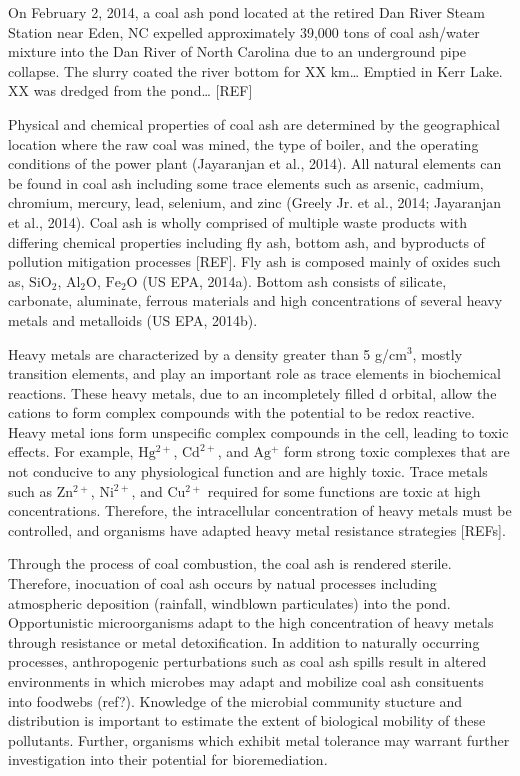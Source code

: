 \documentclass[ms]{uncgdissertationexp}
\theoremstyle{plain}
\theoremstyle{definition}
\theoremstyle{remark}
\begin{document}
  On February 2, 2014, a coal ash pond located at the retired Dan River
  Steam Station near Eden, NC expelled approximately 39,000 tons of coal
  ash/water mixture into the Dan River of North Carolina due to an
  underground pipe collapse. The slurry coated the river bottom for XX
  km\ldots{} Emptied in Kerr Lake. XX was dredged from the pond\ldots{}
  {[}REF{]}
  
  Physical and chemical properties of coal ash are determined by the
  geographical location where the raw coal was mined, the type of boiler,
  and the operating conditions of the power plant (Jayaranjan et al.,
  2014). All natural elements can be found in coal ash including some
  trace elements such as arsenic, cadmium, chromium, mercury, lead,
  selenium, and zinc (Greely Jr. et al., 2014; Jayaranjan et al., 2014).
  Coal ash is wholly comprised of multiple waste products with differing
  chemical properties including fly ash, bottom ash, and byproducts of
  pollution mitigation processes {[}REF{]}. Fly ash is composed mainly of
  oxides such as, \(\mathrm{SiO_2}\), \(\mathrm{Al_2O}\),
  \(\mathrm{Fe_2O}\) (US EPA, 2014a). Bottom ash consists of silicate,
  carbonate, aluminate, ferrous materials and high concentrations of
  several heavy metals and metalloids (US EPA, 2014b).
  
  Heavy metals are characterized by a density greater than 5
  g/\(\mathrm{cm^3}\), mostly transition elements, and play an important
  role as trace elements in biochemical reactions. These heavy metals, due
  to an incompletely filled d orbital, allow the cations to form complex
  compounds with the potential to be redox reactive. Heavy metal ions form
  unspecific complex compounds in the cell, leading to toxic effects. For
  example, \(\mathrm{Hg^{2+}}\), \(\mathrm{Cd^{2+}}\), and
  \(\mathrm{Ag^{+}}\) form strong toxic complexes that are not conducive
  to any physiological function and are highly toxic. Trace metals such as
  \(\mathrm{Zn^{2+}}\), \(\mathrm{Ni^{2+}}\), and \(\mathrm{Cu^{2+}}\)
  required for some functions are toxic at high concentrations. Therefore,
  the intracellular concentration of heavy metals must be controlled, and
  organisms have adapted heavy metal resistance strategies {[}REFs{]}.
  
  Through the process of coal combustion, the coal ash is rendered
  sterile. Therefore, inocuation of coal ash occurs by natual processes
  including atmospheric deposition (rainfall, windblown particulates) into
  the pond. Opportunistic microorganisms adapt to the high concentration
  of heavy metals through resistance or metal detoxification. In addition
  to naturally occurring processes, anthropogenic perturbations such as
  coal ash spills result in altered environments in which microbes may
  adapt and mobilize coal ash consituents into foodwebs (ref?). Knowledge
  of the microbial community stucture and distribution is important to
  estimate the extent of biological mobility of these pollutants. Further,
  organisms which exhibit metal tolerance may warrant further
  investigation into their potential for bioremediation.
  
\end{document}
